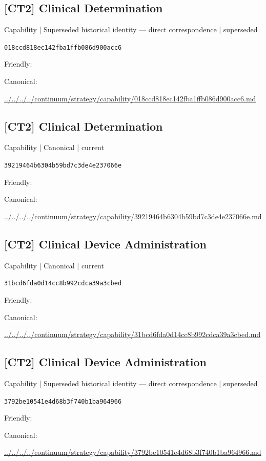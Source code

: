\documentclass[10pt,a4paper]{article}
\begin{document}
\subsection*{[CT2] Clinical Determination}
{\small Capability | Superseded historical identity — direct correspondence | superseded}\par
\texttt{018ccd818ec142fba1ffb086d900acc6}\par
Friendly: \par
Canonical: \par
{\footnotesize\url{../../../../continuum/strategy/capability/018ccd818ec142fba1ffb086d900acc6.md}}\par
\subsection*{[CT2] Clinical Determination}
{\small Capability | Canonical | current}\par
\texttt{39219464b6304b59bd7c3de4e237066e}\par
Friendly: \par
Canonical: \par
{\footnotesize\url{../../../../continuum/strategy/capability/39219464b6304b59bd7c3de4e237066e.md}}\par
\subsection*{[CT2] Clinical Device Administration}
{\small Capability | Canonical | current}\par
\texttt{31bcd6fda0d14cc8b992cdca39a3cbed}\par
Friendly: \par
Canonical: \par
{\footnotesize\url{../../../../continuum/strategy/capability/31bcd6fda0d14cc8b992cdca39a3cbed.md}}\par
\subsection*{[CT2] Clinical Device Administration}
{\small Capability | Superseded historical identity — direct correspondence | superseded}\par
\texttt{3792be10541e4d68b3f740b1ba964966}\par
Friendly: \par
Canonical: \par
{\footnotesize\url{../../../../continuum/strategy/capability/3792be10541e4d68b3f740b1ba964966.md}}\par
\end{document}
